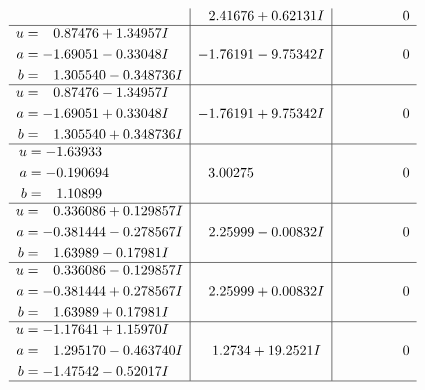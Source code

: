 \documentclass[1p]{elsarticle_modified}
\theoremstyle{definition}
\begin{document}
$$\begin{array}{c|c|c}
 & \phantom{-}2.41676 + 0.62131 I & \phantom{-0.000000 } 0 \\ \hline\begin{aligned}
u &= \phantom{-}0.87476 + 1.34957 I \\
a &= -1.69051 - 0.33048 I \\
b &= \phantom{-}1.305540 - 0.348736 I\end{aligned}
 & -1.76191 - 9.75342 I & \phantom{-0.000000 } 0 \\ \hline\begin{aligned}
u &= \phantom{-}0.87476 - 1.34957 I \\
a &= -1.69051 + 0.33048 I \\
b &= \phantom{-}1.305540 + 0.348736 I\end{aligned}
 & -1.76191 + 9.75342 I & \phantom{-0.000000 } 0 \\ \hline\begin{aligned}
u &= -1.63933\phantom{ +0.000000I} \\
a &= -0.190694\phantom{ +0.000000I} \\
b &= \phantom{-}1.10899\phantom{ +0.000000I}\end{aligned}
 & \phantom{-}3.00275\phantom{ +0.000000I} & \phantom{-0.000000 } 0 \\ \hline\begin{aligned}
u &= \phantom{-}0.336086 + 0.129857 I \\
a &= -0.381444 - 0.278567 I \\
b &= \phantom{-}1.63989 - 0.17981 I\end{aligned}
 & \phantom{-}2.25999 - 0.00832 I & \phantom{-0.000000 } 0 \\ \hline\begin{aligned}
u &= \phantom{-}0.336086 - 0.129857 I \\
a &= -0.381444 + 0.278567 I \\
b &= \phantom{-}1.63989 + 0.17981 I\end{aligned}
 & \phantom{-}2.25999 + 0.00832 I & \phantom{-0.000000 } 0 \\ \hline\begin{aligned}
u &= -1.17641 + 1.15970 I \\
a &= \phantom{-}1.295170 - 0.463740 I \\
b &= -1.47542 - 0.52017 I\end{aligned}
 & \phantom{-}1.2734 + 19.2521 I & \phantom{-0.000000 } 0\\
 \hline 
 \end{array}$$\newpage$$\begin{array}{c|c|c}  

\end{array}$$
\end{document}
